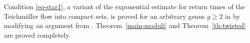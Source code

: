 Condition \eqref{eq-star1}, a variant of the exponential estimate for return times of the Teichmüller flow into compact sets, is proved for an arbitrary genus $g\ge 2$ in \cite[Prop.\,11.3]{BuSo18a} by modifying an
argument from \cite{buf-jams}. Theorem~\ref{main-moduli} and Theorem~\ref{th-twisted} are proved completely.


